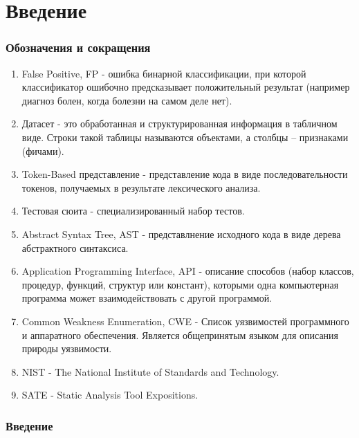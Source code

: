 \chapter{Введение}
\label{sec:Chapter0} 

\subsection*{Обозначения и сокращения}

\begin{enumerate}
    \item False Positive, FP - ошибка бинарной классификации, при которой классификатор ошибочно предсказывает положительный результат (например диагноз болен, когда болезни на самом деле нет).
    \item Датасет - это обработанная и структурированная информация в табличном виде. Строки такой таблицы называются объектами, а столбцы – признаками (фичами).
    \item Token-Based представление - представление кода в виде последовательности токенов, получаемых в результате лексического анализа.
    \item Тестовая сюита - специализированный набор тестов.
    \item Abstract Syntax Tree, AST - представлнение исходного кода в виде дерева абстрактного синтаксиса.
    \item Application Programming Interface, API - описание способов (набор классов, процедур, функций, структур или констант), которыми одна компьютерная программа может взаимодействовать с другой программой.
    \item Common Weakness Enumeration, CWE \cite{CWE-doc} - Список уязвимостей программного и аппаратного обеспечения. Является общепринятым языком для описания природы уязвимости.
    \item NIST - The National Institute of Standards and Technology.
    \item SATE - Static Analysis Tool Expositions.
\end{enumerate}

\subsection*{Введение}

